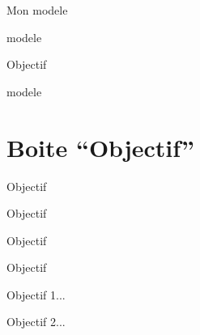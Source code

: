 \documentclass[a4paper,12pt]{article}
\begin{document}
\begin{code}%
\begin{modele}
	Mon modele
\end{modele}
\end{code}

\begin{modele}
	modele
\end{modele}%

\begin{code}%
\begin{modele*}
	Objectif
\end{modele*}

\end{code}
\begin{modele*}
	modele
\end{modele*}%


	\section{Boite ``Objectif''}

\begin{code}%
\begin{objectif}
	Objectif
\end{objectif}
\end{code}

\begin{objectif}
	Objectif
\end{objectif}%

\begin{code}%
\begin{objectif*}
	Objectif
\end{objectif*}
\end{code}

\begin{objectif*}
	Objectif
\end{objectif*}%

\begin{code}%
\begin{objectifs}
	\item Objectif 1...
	\item Objectif 2...
\end{objectifs}
\end{code}
\end{document}
